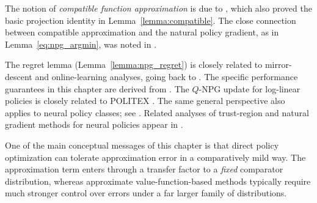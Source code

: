 The notion of \emph{compatible function approximation} is due to
\cite{sutton1999policy}, which also proved the basic projection identity in
Lemma~\ref{lemma:compatible}. The close connection between compatible approximation
and the natural policy gradient, as in Lemma~\ref{eq:npg_argmin}, was noted in
\cite{Kakade01}.

The regret lemma (Lemma~\ref{lemma:npg_regret}) is closely related to mirror-descent
and online-learning analyses, going back to \cite{even-dar2009online}. The specific
performance guarantees in this chapter are derived from \cite{agarwal2019optimality}.
The $Q$-NPG update for log-linear policies is closely related to POLITEX
\cite{abbasi2019politex}. The same general perspective also applies to neural policy
classes; see \cite{agarwal2019optimality}. Related analyses of trust-region and natural
gradient methods for neural policies appear in \cite{caiTRPO,schulman2015trust}.

One of the main conceptual messages of this chapter is that direct policy optimization
can tolerate approximation error in a comparatively mild way. The approximation term
enters through a transfer factor to a \emph{fixed} comparator distribution, whereas
approximate value-function-based methods typically require much stronger control over
errors under a far larger family of distributions.


